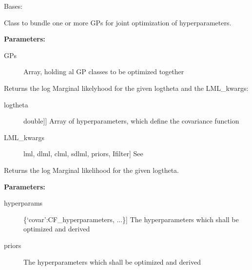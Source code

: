 \documentclass[letterpaper,10pt,english]{sphinxmanual}
\begin{document}
\begin{fulllineitems}
\label{gp:pygp.gp.composite.GroupGP}
Bases: {\hyperref[gp:pygp.gp.gp_base.GP]{}}

Class to bundle one or more GPs for joint
optimization of hyperparameters.

\textbf{Parameters:}
\begin{description}
\item[{GPs}] \leavevmode{[}{[}\code{gpr.GP}{]}{]}
Array, holding al GP classes to be optimized together

\end{description}

\begin{fulllineitems}
\label{gp:pygp.gp.composite.GroupGP.LML}
Returns the log Marginal likelyhood for the given logtheta
and the LML\_kwargs:
\begin{description}
\item[{logtheta}] \leavevmode{[}{[}double{]}{]}
Array of hyperparameters, which define the covariance function

\item[{LML\_kwargs}] \leavevmode{[}lml, dlml, clml, sdlml, priors, Ifilter{]}
See 

\end{description}

\end{fulllineitems}


\begin{fulllineitems}
\label{gp:pygp.gp.composite.GroupGP.LMLgrad}
Returns the log Marginal likelihood for the given logtheta.

\textbf{Parameters:}
\begin{description}
\item[{hyperparams}] \leavevmode{[}\{`covar':CF\_hyperparameters, ...\}{]}
The hyperparameters which shall be optimized and derived

\item[{priors}] 
The hyperparameters which shall be optimized and derived


\end{description}
\end{fulllineitems}
\end{fulllineitems}
\end{document}
